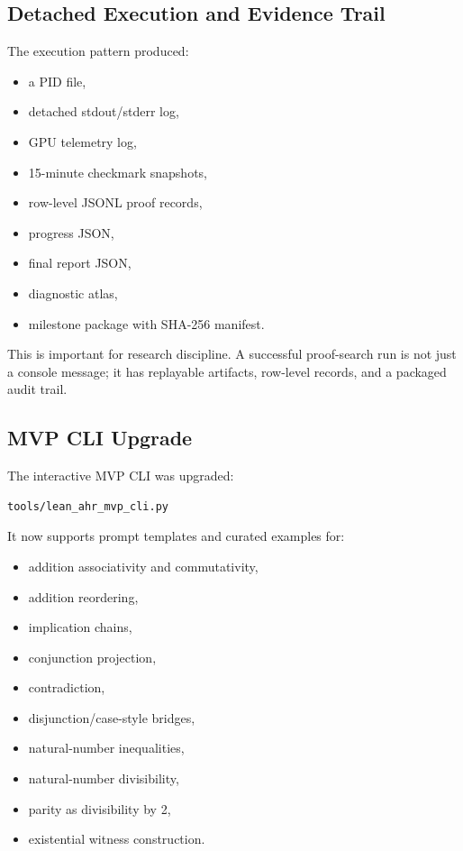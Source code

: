 \documentclass[11pt]{article}
\begin{document}
\subsection{Detached Execution and Evidence Trail}

The execution pattern produced:

\begin{itemize}
  \item a PID file,
  \item detached stdout/stderr log,
  \item GPU telemetry log,
  \item 15-minute checkmark snapshots,
  \item row-level JSONL proof records,
  \item progress JSON,
  \item final report JSON,
  \item diagnostic atlas,
  \item milestone package with SHA-256 manifest.
\end{itemize}

This is important for research discipline. A successful proof-search run is not just a console message; it has
replayable artifacts, row-level records, and a packaged audit trail.

\subsection{MVP CLI Upgrade}

The interactive MVP CLI was upgraded:

\begin{lstlisting}[style=leanstyle]
tools/lean_ahr_mvp_cli.py
\end{lstlisting}

It now supports prompt templates and curated examples for:

\begin{itemize}
  \item addition associativity and commutativity,
  \item addition reordering,
  \item implication chains,
  \item conjunction projection,
  \item contradiction,
  \item disjunction/case-style bridges,
  \item natural-number inequalities,
  \item natural-number divisibility,
  \item parity as divisibility by 2,
  \item existential witness construction.
\end{itemize}
\end{document}

